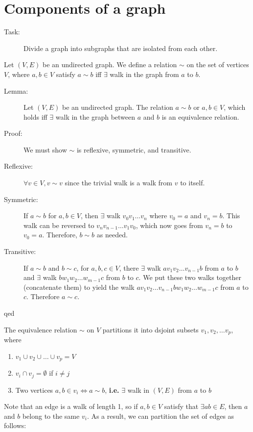 \documentclass[10pt]{article}
\begin{document}
	\section{Components of a graph}
	\begin{description}
		\item[Task:] Divide a graph into subgraphs that are isolated from each other.
	\end{description}
	Let $(V, E)$ be an undirected graph. We define a relation $\sim$ on the set of vertices $V$, where $a, b \in V$ satisfy $a \sim b$ iff $\exists$ walk in the graph from $a$ to $b$.
	\begin{description}
		\item[Lemma:] Let $(V, E)$ be an undirected graph. The relation $a \sim b$ or $a, b \in V$, which holds iff $\exists$ walk in the graph between $a$ and $b$ is an equivalence relation.
		\item[Proof:] We must show $\sim$ is reflexive, symmetric, and transitive.
		\item[Reflexive:] $\forall v \in V, v \sim v$ since the trivial walk is a walk from $v$ to itself.
		\item[Symmetric:] If $a \sim b$ for $a, b \in V$, then $\exists$ walk $v_0 v_1 \dots v_n$ where $v_0 = a$ and $v_n = b$. This walk can be reversed to $v_n v_{n-1} \dots v_1 v_0$, which now goes from $v_n = b$ to $v_0 = a$. Therefore, $b \sim b$ as needed.
		\item[Transitive:] If $a \sim b$ and $b \sim c$, for $a, b, c \in V$, there $\exists$ walk $a v_1 v_2 \dots v_{n-1} b$ from $a$ to $b$ and $\exists$ walk $b w_1 w_2 \dots w_{m-1} c$ from $b$ to $c$. We put these two walks together (concatenate them) to yield the walk $a v_1 v_2 \dots v_{n-1} b w_1 w_2 \dots w_{m-1} c$ from $a$ to $c$. Therefore $a \sim c$.
		\item[qed]
	\end{description}
	The equivalence relation $\sim$ on $V$ partitions it into dsjoint subsets $v_1, v_2, \dots v_p$, where
	\begin{enumerate}
		\item $v_1 \cup v_2 \cup \dots \cup v_p = V$
		\item $v_i \cap v_j = \emptyset$ if $i \neq j$
		\item Two vertices $a, b \in v_i \Leftrightarrow a \sim b$, \textbf{i.e.} $\exists$ walk in $(V, E)$ from $a$ to $b$
	\end{enumerate}
	Note that an edge is a walk of length 1, so if $a, b \in V$ satisfy that $\exists ab \in E$, then $a$ and $b$ belong to the same $v_i$. As a result, we can partition the set of edges as follows:
\end{document}
